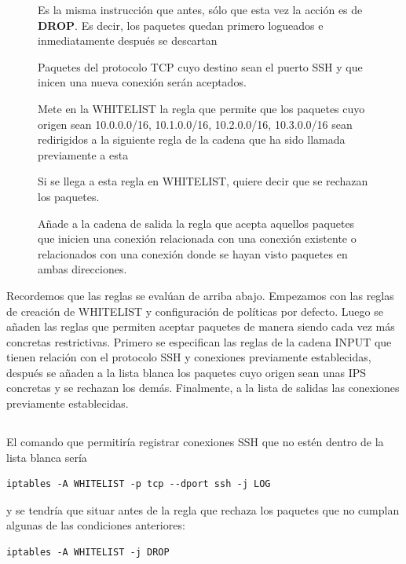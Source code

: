 \documentclass[10pt,a4paper]{article}
\begin{document}
\begin{figure}[htpb]
	
    \caption{Es la misma instrucción que antes, sólo que esta vez la acción es de \textbf{DROP}. Es decir, los paquetes quedan primero logueados e inmediatamente después se descartan}
\end{figure}

\begin{figure}[htpb]
	
    \caption{Paquetes del protocolo TCP cuyo destino sean el puerto SSH y que inicen una nueva conexión serán aceptados.}
\end{figure}

\begin{figure}[htpb]
	
    \caption{Mete en la WHITELIST la regla que permite que los paquetes cuyo origen sean 10.0.0.0/16, 10.1.0.0/16, 10.2.0.0/16, 10.3.0.0/16 sean redirigidos a la siguiente regla de la cadena que ha sido llamada previamente a esta}
\end{figure}

\begin{figure}[htpb]
	
    \caption{Si se llega a esta regla en WHITELIST, quiere decir que se rechazan los paquetes.}
\end{figure}

\begin{figure}[htpb]
	
    \caption{Añade a la cadena de salida la regla que acepta aquellos paquetes que inicien una conexión relacionada con una conexión existente o relacionados con una conexión donde se hayan visto paquetes en ambas direcciones.}
\end{figure}

Recordemos que las reglas se evalúan de arriba abajo. Empezamos con las reglas de creación de WHITELIST y configuración de políticas por defecto. Luego se añaden las reglas que permiten aceptar paquetes de manera siendo cada vez más concretas restrictivas. Primero se especifican las reglas de la cadena INPUT que tienen relación con el protocolo SSH y conexiones previamente establecidas, después se añaden a la lista blanca los paquetes cuyo origen sean unas IPS concretas y se rechazan los demás. Finalmente, a la lista de salidas las conexiones previamente establecidas.

\pagebreak
\subsection{}
El comando que permitiría registrar conexiones SSH que no estén dentro de la lista blanca sería
\begin{lstlisting}
iptables -A WHITELIST -p tcp --dport ssh -j LOG
\end{lstlisting}
y se tendría que situar antes de la regla que rechaza los paquetes que no cumplan algunas de las condiciones anteriores:
\begin{lstlisting}
iptables -A WHITELIST -j DROP
\end{lstlisting}
\end{document}
